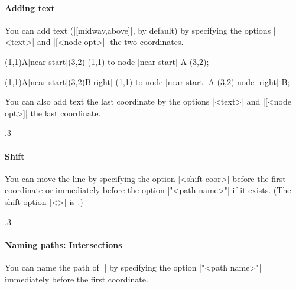 \paragraph{Adding text}

You can add text  (|[midway,above]|, by default) by specifying the options |{<text>}| and |[<node opt>]|  the two coordinates.

\begin{tztikz}{}
(1,1){A}[near start](3,2) %
   (1,1) to node [near start] {A} (3,2);

(1,1){A}[near start](3,2){B}[right] %
   (1,1) to node [near start] {A} 
                        (3,2)    node [right]      {B};
\end{tztikz}


You can also add text  the last coordinate by the options |{<text>}| and |[<node opt>]|  the last coordinate.

\begin{tzcode}{.3}
\end{tzcode}

\paragraph{Shift}
You can move the line by specifying the option |<shift coor>| before the first coordinate or immediately before the option |"<path name>"| if it exists.
(The  shift option |<>| is .)

\begin{tzcode}{.3}
\end{tzcode}

\paragraph{Naming paths: Intersections}
You can name the path of |\tzto| by specifying the option |"<path name>"| immediately before the first coordinate.

